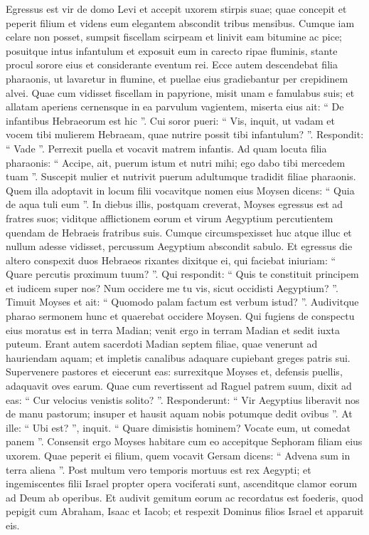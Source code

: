 \begin{biblechapter}
\begin{biblechapter}
\verse Egressus est vir de domo Levi et accepit uxorem stirpis suae; 
\verse quae concepit et peperit filium et videns eum elegantem abscondit tribus mensibus. 
 \verse Cumque iam celare non posset, sumpsit fiscellam scirpeam et linivit eam bitumine ac pice; posuitque intus infantulum et exposuit eum in carecto ripae fluminis, 
\verse stante procul sorore eius et considerante eventum rei.
 \verse Ecce autem descendebat filia pharaonis, ut lavaretur in flumine, et puellae eius gradiebantur per crepidinem alvei. Quae cum vidisset fiscellam in papyrione, misit unam e famulabus suis; et allatam 
\verse aperiens cernensque in ea parvulum vagientem, miserta eius ait: “ De infantibus Hebraeorum est hic ”. 
\verse Cui soror pueri: “ Vis, inquit, ut vadam et vocem tibi mulierem Hebraeam, quae nutrire possit tibi infantulum? ”. 
\verse Respondit: “ Vade ”. Perrexit puella et vocavit matrem infantis. 
\verse Ad quam locuta filia pharaonis: “ Accipe, ait, puerum istum et nutri mihi; ego dabo tibi mercedem tuam ”. Suscepit mulier et nutrivit puerum adultumque tradidit filiae pharaonis. 
\verse Quem illa adoptavit in locum filii vocavitque nomen eius Moysen dicens: “ Quia de aqua tuli eum ”.
 \verse In diebus illis, postquam creverat, Moyses egressus est ad fratres suos; viditque afflictionem eorum et virum Aegyptium percutientem quendam de Hebraeis fratribus suis. 
\verse Cumque circumspexisset huc atque illuc et nullum adesse vidisset, percussum Aegyptium abscondit sabulo. 
\verse Et egressus die altero conspexit duos Hebraeos rixantes dixitque ei, qui faciebat iniuriam: “ Quare percutis proximum tuum? ”. 
\verse Qui respondit: “ Quis te constituit principem et iudicem super nos? Num occidere me tu vis, sicut occidisti Aegyptium? ”. Timuit Moyses et ait: “ Quomodo palam factum est verbum istud? ”.
 \verse Audivitque pharao sermonem hunc et quaerebat occidere Moysen. Qui fugiens de conspectu eius moratus est in terra Madian; venit ergo in terram Madian et sedit iuxta puteum. 
\verse Erant autem sacerdoti Madian septem filiae, quae venerunt ad hauriendam aquam; et impletis canalibus adaquare cupiebant greges patris sui. 
 \verse Supervenere pastores et eiecerunt eas: surrexitque Moyses et, defensis puellis, adaquavit oves earum. 
\verse Quae cum revertissent ad Raguel patrem suum, dixit ad eas: “ Cur velocius venistis solito? ”. 
\verse Responderunt: “ Vir Aegyptius liberavit nos de manu pastorum; insuper et hausit aquam nobis potumque dedit ovibus ”. 
\verse At ille: “ Ubi est? ”, inquit. “ Quare dimisistis hominem? Vocate eum, ut comedat panem ”. 
\verse Consensit ergo Moyses habitare cum eo accepitque Sephoram filiam eius uxorem. 
\verse Quae peperit ei filium, quem vocavit Gersam dicens: “ Advena sum in terra aliena ”.
 \verse Post multum vero temporis mortuus est rex Aegypti; et ingemiscentes filii Israel propter opera vociferati sunt, ascenditque clamor eorum ad Deum ab operibus. 
\verse Et audivit gemitum eorum ac recordatus est foederis, quod pepigit cum Abraham, Isaac et Iacob; 
\verse et respexit Dominus filios Israel et apparuit eis.
 

\end{biblechapter}
\end{biblechapter}
